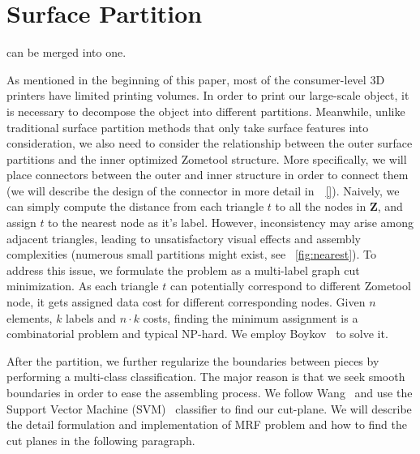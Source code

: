 \section{Surface Partition}
\label{sec:surf_part}

 can be merged into one.

As mentioned in the beginning of this paper, most of the consumer-level 3D printers have limited printing volumes.
In order to print our large-scale object, it is necessary to decompose the object into different partitions.
Meanwhile, unlike traditional surface partition methods that only take surface features into consideration, we also need to consider the relationship between the outer surface partitions and the inner optimized Zometool structure.
More specifically, we will place connectors between the outer and inner structure in order to connect them (we will describe the design of the connector in more detail in~\secname~\ref{}).
Naively, we can simply compute the distance from each triangle $t$ to all the nodes in $\mathbf{Z}$, and assign $t$ to the nearest node as it's label.
However, inconsistency may arise among adjacent triangles, leading to unsatisfactory visual effects and assembly complexities (numerous small partitions might exist, see \figname~\ref{fig:nearest}). 
To address this issue, we formulate the problem as a multi-label graph cut minimization.
As each triangle $t$ can potentially correspond to different Zometool node, it gets assigned data cost for different corresponding nodes.
Given $n$ elements, $k$ labels and $n\cdot k$ costs, finding the minimum assignment is a combinatorial problem and typical NP-hard.
We employ Boykov~\cite{boykov:2004:experimental} to solve it.

After the partition, we further regularize the boundaries between pieces by performing a multi-class classification.
The major reason is that we seek smooth boundaries in order to ease the assembling process.
We follow Wang~\cite{wang2016improved} and use the Support Vector Machine (SVM)~\cite{cortes1995support} classifier to find our cut-plane. 
We will describe the detail formulation and implementation of MRF problem and how to find the cut planes in the following paragraph.

